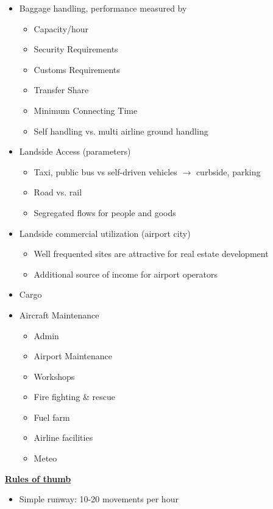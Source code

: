 \documentclass[9pt, landscape, fleqn]{scrartcl}
\begin{document}
\begin{multicols*}{3}
\begin{itemize}
\begin{itemize}
    \end{itemize}
    \item Baggage handling, performance measured by 
    \begin{itemize}
        \item Capacity/hour 
        \item Security Requirements 
        \item Customs Requirements 
        \item Transfer Share 
        \item Minimum Connecting Time 
        \item Self handling vs. multi airline ground handling 
    \end{itemize}
    \item Landside Access (parameters)
    \begin{itemize}
        \item Taxi, public bus vs self-driven vehicles $\rightarrow$ curbside, parking 
        \item Road vs. rail 
        \item Segregated flows for people and goods 
    \end{itemize}
    \item Landside commercial utilization (airport city)
    \begin{itemize}
        \item Well frequented sites are attractive for real estate development 
        \item Additional source of income for airport operators 
    \end{itemize}
    \item Cargo 
    \item Aircraft Maintenance 
    \begin{itemize}
        \item Admin 
        \item Airport Maintenance 
        \item Workshops 
        \item Fire fighting \& rescue 
        \item Fuel farm 
        \item Airline facilities 
        \item Meteo 
    \end{itemize}
\end{itemize}
\underline{\textbf{Rules of thumb}}
\begin{itemize}
    \item Simple runway: 10-20 movements per hour 

\end{itemize}
\end{multicols*}
\end{document}

